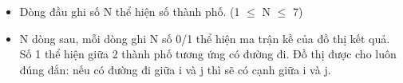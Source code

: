 \begin{itemize}
	\item     Dòng đầu ghi số N thể hiện số thành phố. (1  $\le$  N  $\le$  7)   
\end{itemize}
\begin{itemize}
	\item     N dòng sau, mỗi dòng ghi N số 0/1 thể hiện ma trận kề của đồ thị kết quả. Số 1 thể hiện giữa 2 thành phố tương ứng có đường đi. Đồ thị được cho luôn đúng đắn: nếu có đường đi giữa i và j thì sẽ có cạnh giữa i và j.   
\end{itemize}

\